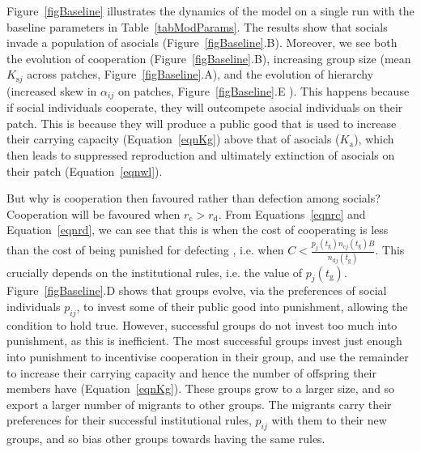 \documentclass{rstb}
\begin{document}
\begin{linenumbers}
\begin{table}[!p]
	\label{tabModParams}
\end{table} 

Figure~\ref{figBaseline} illustrates the dynamics of the model on a single run with the baseline parameters in Table~\ref{tabModParams}. The results show that socials invade a population of asocials (Figure~\ref{figBaseline}.B). Moreover, we see both the evolution of cooperation (Figure~\ref{figBaseline}.B), increasing group size (mean $K_{\mathrm{s}j}$ across patches, Figure~\ref{figBaseline}.A), and the evolution of hierarchy (increased skew in $\alpha_{ij}$ on patches, Figure~\ref{figBaseline}.E ). This happens because if social individuals cooperate, they will outcompete asocial individuals on their patch. This is because they will produce a public good that is used to increase their carrying capacity (Equation~\ref{eqnKg}) above that of asocials ($K_\mathrm{a}$), which then leads to suppressed reproduction and ultimately extinction of asocials on their patch (Equation~\ref{eqnwl}). 

But why is cooperation then favoured rather than defection among socials? Cooperation will be favoured when $r_\mathrm{c}>r_\mathrm{d}$. From Equations~\ref{eqnrc} and Equation~\ref{eqnrd}, we can see that this is when the cost of cooperating is less than the cost of being punished for defecting \cite{Boyd:1992:a}, i.e. when $C < \frac{p_j(t_\mathrm{g})n_{\mathrm{c}j}(t_\mathrm{g})B}{n_{\mathrm{d}j}\left(t_\mathrm{g}\right)}$. This crucially depends on the institutional rules, i.e. the value of $p_j(t_\mathrm{g})$. Figure~\ref{figBaseline}.D shows that groups evolve, via the preferences of social individuals $p_{ij}$, to invest some of their public good into punishment, allowing the condition to hold true. However, successful groups do not invest too much into punishment, as this is inefficient. The most successful groups invest just enough into punishment to incentivise cooperation in their group, and use the remainder to increase their carrying capacity and hence the number of offspring their members have (Equation~\ref{eqnKg}). These groups grow to a larger size, and so export a larger number of migrants to other groups. The migrants carry their preferences for their successful institutional rules, $p_{ij}$ with them to their new groups, and so bias other groups towards having the same rules.  


\end{linenumbers}
\end{document}
